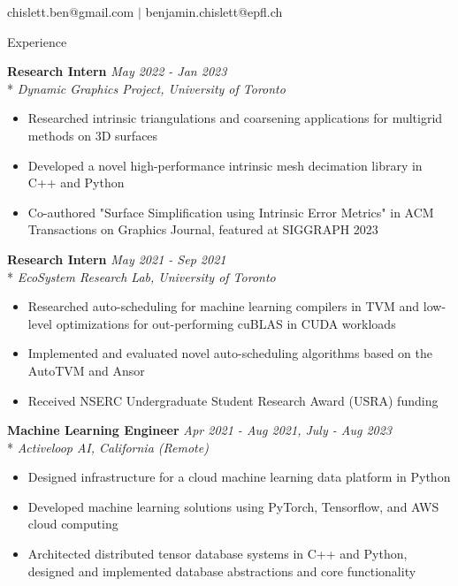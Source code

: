 \documentclass[11pt, letterpaper]{article}
\title{}
\author{Benjamin Chislett}
\date{}
\begin{document}
\begin{center}
  \Huge\theauthor
  \par
  \vspace{1mm}
  \large{chislett.ben@gmail.com} $|$ \large{benjamin.chislett@epfl.ch}
  \par

\end{center}

\begin{section}{Experience}

\textbf{Research Intern}
\hfill
\textit{May 2022 - Jan 2023}\\*
\textit{Dynamic Graphics Project, University of Toronto}
\begin{itemize}
  \item Researched intrinsic triangulations and coarsening applications for multigrid methods on 3D surfaces
  \item Developed a novel high-performance intrinsic mesh decimation library in C++ and Python
  \item Co-authored "Surface Simplification using Intrinsic Error Metrics" in ACM Transactions on Graphics Journal, featured at SIGGRAPH 2023 \\
\end{itemize}

\textbf{Research Intern}
\hfill
\textit{May 2021 - Sep 2021}\\*
\textit{EcoSystem Research Lab, University of Toronto}
\begin{itemize}
  \item Researched auto-scheduling for machine learning compilers in TVM and low-level optimizations for out-performing cuBLAS in CUDA workloads
  \item Implemented and evaluated novel auto-scheduling algorithms based on the AutoTVM and Ansor
  \item Received NSERC Undergraduate Student Research Award (USRA) funding \\
\end{itemize}

\textbf{Machine Learning Engineer}
\hfill
\textit{Apr 2021 - Aug 2021, July - Aug 2023}\\*
\textit{Activeloop AI, California (Remote)}
\begin{itemize}
  \item Designed infrastructure for a cloud machine learning data platform in Python
  \item Developed machine learning solutions using PyTorch, Tensorflow, and AWS cloud computing
  \item Architected distributed tensor database systems in C++ and Python, designed and implemented database abstractions and core functionality \\
\end{itemize}


\end{section}
\end{document}

